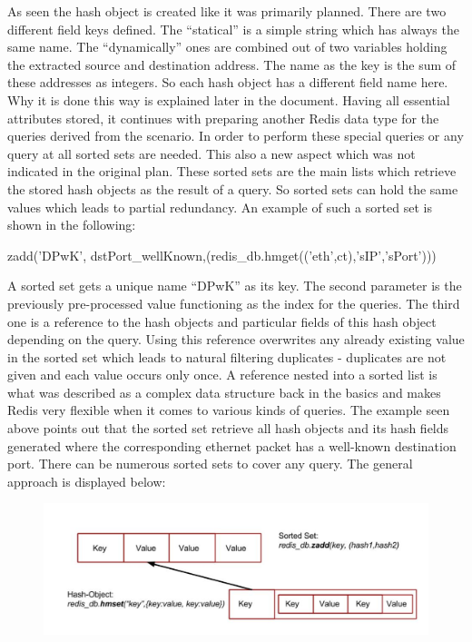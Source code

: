 As seen the hash object is created like it was primarily planned. There are two different field keys defined. The “statical” is a simple string which has always the same name. The “dynamically” ones are combined out of two variables holding the extracted source and destination address. The name as the key is the sum of these addresses as integers. So each hash object has a different field name here. Why it is done this way is explained later in the document. 
Having all essential attributes stored, it continues with preparing another Redis data type for the queries derived from the scenario. In order to perform these special queries or any query at all sorted sets are needed. This also a new aspect which was not indicated in the original plan. These sorted sets are the main lists which retrieve the stored hash objects as the result of a query. So sorted sets can hold the same values which leads to partial redundancy. An example of such a sorted set is shown in the following:\\

\begin{center}
zadd('DPwK', dstPort_wellKnown,(redis_db.hmget(('eth',ct),'sIP','sPort')))\\
\end{center}

A sorted set gets a unique name “DPwK” as its key. The second parameter is the previously pre-processed value functioning as the index for the queries. The third one is a reference to the hash objects and particular fields of this hash object depending on the query. Using this reference overwrites any already existing value in the sorted set which leads to natural filtering duplicates - duplicates are not given and each value occurs only once. A reference nested into a sorted list is what was described as a complex data structure back in the basics and makes Redis very flexible when it comes to various kinds of queries. The example seen above points out that the sorted set retrieve all hash objects and its hash fields generated where the corresponding ethernet packet has a well-known destination port. There can be numerous sorted sets to cover any query. The general approach is displayed below:

\begin{figure}[h]
	\centerline{\includegraphics[width=1.0\textwidth]{resources/solution3-2.png}}
\end{figure}

